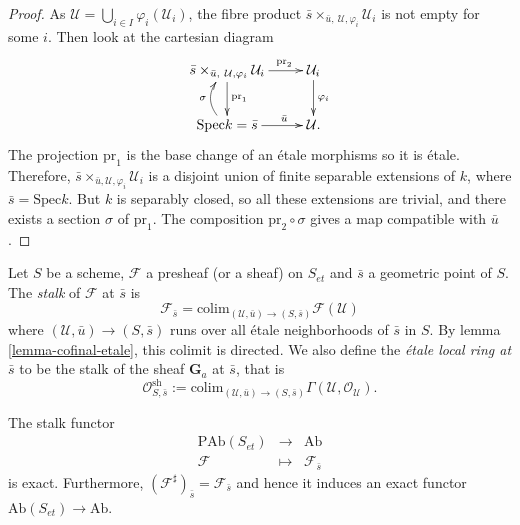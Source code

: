\begin{proof}
As $\mathcal{U} = \bigcup_{i\in I}\varphi_i(\mathcal{U}_i)$, the fibre product
$\bar s \times_{\bar u, \ \mathcal{U}, \varphi_i} \mathcal{U}_i$ is not empty
for some $i$. Then look at the cartesian diagram
$$
\xymatrix{
{\bar s \times_{\bar u, \ \mathcal{U}, \varphi_i} \mathcal{U}_i}
\ar^{\text{pr}_1}[d] \ar^{\qquad \text{pr}_2}[r] & {\mathcal{U}_i}
\ar^{\varphi_i}[d] \\
{\text{Spec} k = \bar s} \ar@/^1pc/^{\sigma}[u] \ar^{\qquad \bar u}[r] &
{\mathcal{U}.}
}
$$
The projection $\text{pr}_1$ is the base change of an \'etale morphisms so it
is \'etale. Therefore, $\bar s \times_{\bar u , \mathcal{U}, \varphi_i}
\mathcal{U}_i$ is a disjoint union of finite separable extensions of $k$, where
$\bar s = \text{Spec} k$. But $k$ is separably closed, so all these extensions
are trivial, and there exists a section $\sigma$ of $\text{pr}_1$. The
composition
$\text{pr}_2 \circ \sigma$ gives a map compatible with $\bar u$.
\end{proof}

\begin{definition}
\label{definition-etale-local-rings}
Let $S$ be a scheme, $\mathcal{F}$ a presheaf (or a sheaf) on $S_{et}$ and
$\bar s$ a geometric point of $S$. The {\it stalk} of $\mathcal{F}$ at $\bar
s$ is
$$
\mathcal{F}_{\bar s} = \text{colim}_{(\mathcal{U}, \bar u) \to (S,\bar s)}
\mathcal{F}(\mathcal{U})
$$
where $(\mathcal{U}, \bar u) \to (S,\bar s)$ runs over all \'etale
neighborhoods of $\bar s$ in $S$. By lemma \ref{lemma-cofinal-etale},
this colimit is directed. We also define the {\it \'etale local ring at $\bar
s$} to be the stalk of the sheaf $\mathbf{G}_a$ at $\bar s$, that is
$$
\mathcal{O}_{S, \bar{s}}^\text{sh} := \text{colim}_{(\mathcal{U}, \bar u) \to
(S,\bar s)} \Gamma(\mathcal{U}, \mathcal{O}_\mathcal{U}).
$$
\end{definition}

\begin{lemma}
\label{lemma-stalk-exact}
The stalk functor
$$
\begin{matrix}
\text{PAb}(S_{et}) & \longrightarrow & \text{Ab}\\
\mathcal{F} & \longmapsto & \mathcal{F}_{\bar s}
\end{matrix}
$$
is exact. Furthermore, $\left(\mathcal{F}^\sharp\right)_{\bar s} =
\mathcal{F}_{\bar s}$ and hence it induces an exact functor
$\text{Ab}(S_{et})\to \text{Ab}$.
\end{lemma}

